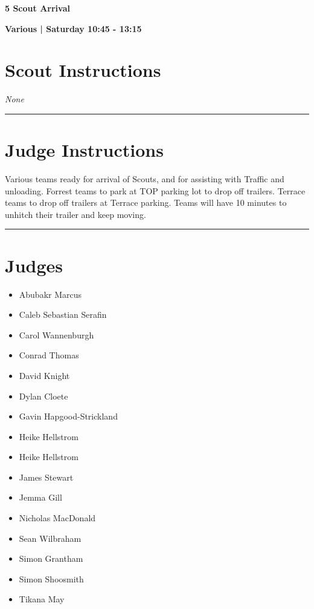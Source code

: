 \documentclass[10pt]{article}
\newcommand{\newtitle}[1]{\begin{center}{\Huge\bfseries #1 }\\ \vspace{5mm}\end{center}}
\newcommand{\newsubtitle}[1]{\begin{center}{\color{grey}\Large\bfseries #1 }\\ \vspace{5mm}\end{center}}
\begin{document}
	\vspace{1cm}


	\clearpage
		\newtitle{5 Scout Arrival }
	\newsubtitle{Various | Saturday 10:45 - 13:15}
		\setcounter{section}{4}
	\section*{Scout Instructions}
		\textit{None}
	
	\vspace{0.5cm}
	\hrule
	\vspace{0.5cm}

		\section*{Judge Instructions}
		Various teams ready for arrival of Scouts, and for assisting with Traffic and unloading. Forrest teams to park at TOP parking lot to drop off trailers. Terrace teams to drop off trailers at Terrace parking. Teams will have 10 minutes to unhitch their trailer and keep moving.
\vspace{0.5cm}
	\hrule
	\vspace{0.5cm}
		\section*{\faUsers \: Judges}

		

	\begin{multicols}{2}

		\begin{itemize}
									\item Abubakr Marcus
									\item Caleb Sebastian Serafin
									\item Carol Wannenburgh
									\item Conrad Thomas
									\item David Knight
									\item Dylan Cloete
									\item Gavin Hapgood-Strickland
									\item Heike Hellstrom
						\end{itemize}

		\vfill\null
		\columnbreak

		\begin{itemize}
									\item Heike Hellstrom
									\item James Stewart
									\item Jemma Gill
									\item Nicholas MacDonald
									\item Sean Wilbraham
									\item Simon Grantham
									\item Simon Shoosmith
									\item Tikana May
						\end{itemize}

		\vfill\null

		\end{multicols}
\end{document}
